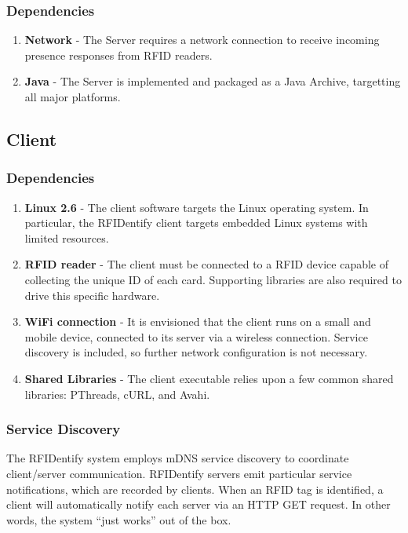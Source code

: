 \documentclass{article}
\begin{document}
        \subsubsection{Dependencies}
	\begin{enumerate}
	 \item	\textbf{Network} - 
	   The Server requires a network connection to receive incoming presence responses from RFID readers.
                
         \item \textbf{Java} -
           The Server is implemented and packaged as a Java Archive, targetting all major platforms.
	\end{enumerate}
	
	\subsection{Client}

        \subsubsection{Dependencies}
        \begin{enumerate}
          \item \textbf{Linux 2.6} - 
            The client software targets the Linux operating system. 
            In particular, the RFIDentify client targets embedded Linux systems with limited resources.

          \item \textbf{RFID reader} - 
            The client must be connected to a RFID device capable of collecting the unique ID of each card. 
            Supporting libraries are also required to drive this specific hardware.

          \item \textbf{WiFi connection} - 
            It is envisioned that the client runs on a small and mobile device, connected to its server
            via a wireless connection. Service discovery is included, so further network configuration is not
            necessary.

          \item \textbf{Shared Libraries} - 
            The client executable relies upon a few common shared libraries: PThreads, cURL, and Avahi.
        \end{enumerate}
        
        \subsubsection{Service Discovery}
        The RFIDentify system employs mDNS service discovery to coordinate client/server communication. 
        RFIDentify servers emit particular service notifications, which are recorded by clients.  When an
        RFID tag is identified, a client will automatically notify each server via an HTTP GET request.
        In other words, the system ``just works'' out of the box.
\end{document}
